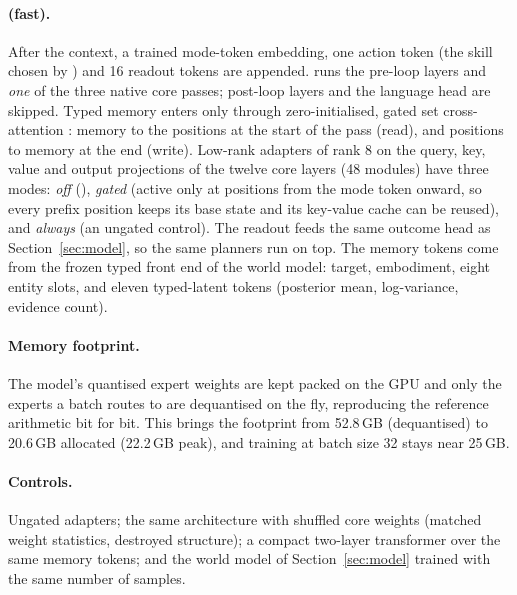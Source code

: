 \paragraph{\sysI{} (fast).} After the \sysII{} context, a trained mode-token embedding, one action token (the
skill chosen by \sysII) and 16 readout tokens are appended. \sysI{} runs the pre-loop layers and \emph{one} of
the three native core passes; post-loop layers and the language head are skipped. Typed memory enters only
through zero-initialised, gated set cross-attention \citep{lee2019set,jaegle2021perceiver}: memory to the
\sysI{} positions at the start of the pass (read), and \sysI{} positions to memory at the end (write).
Low-rank adapters \citep{hu2022lora} of rank 8 on the query, key, value and output projections of the twelve
core layers (48 modules) have three modes: \emph{off} (\sysII), \emph{gated} (active only at positions from the
mode token onward, so every \sysII{} prefix position keeps its base state and its key-value cache can be reused),
and \emph{always} (an ungated control). The readout feeds the same outcome head as Section~\ref{sec:model}, so
the same planners run on top. The memory tokens come from the frozen typed front end of the world model:
target, embodiment, eight entity slots, and eleven typed-latent tokens (posterior mean, log-variance, evidence
count).

\paragraph{Memory footprint.} The model's quantised expert weights are kept packed on the GPU and only the
experts a batch routes to are dequantised on the fly, reproducing the reference arithmetic bit for bit. This
brings the footprint from 52.8\,GB (dequantised) to 20.6\,GB allocated (22.2\,GB peak), and \sysI{} training at
batch size 32 stays near 25\,GB.

\paragraph{Controls.} Ungated adapters; the same architecture with shuffled core weights (matched weight
statistics, destroyed structure); a compact two-layer transformer \sysI{} over the same memory tokens; and the
world model of Section~\ref{sec:model} trained with the same number of samples.
